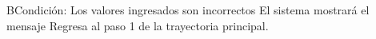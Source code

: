	\begin{UCtrayectoriaA}{B}{Condición: Los valores ingresados son incorrectos}
		\UCpaso[\UCsist] El sistema mostrará el mensaje 
		\UCpaso[\UCsist] Regresa al paso 1 de la trayectoria principal. 
	\end{UCtrayectoriaA}
